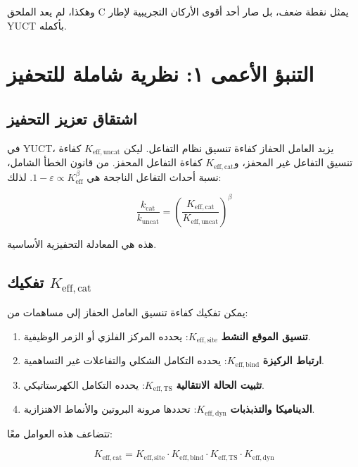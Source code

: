\documentclass[12pt,a4paper]{article}
\theoremstyle{remark}
\newcommand{\Keff}{K_{\mathrm{eff}}}
\newcommand{\eps}{\varepsilon}
\begin{document}
	وهكذا، لم يعد الملحق C يمثل نقطة ضعف، بل صار أحد أقوى الأركان التجريبية لإطار YUCT بأكمله.
	
	\section{التنبؤ الأعمى ١: نظرية شاملة للتحفيز}
	\label{sec:catalysis}
	
	\subsection{اشتقاق تعزيز التحفيز}
	
	في YUCT، يزيد العامل الحفاز كفاءة تنسيق نظام التفاعل. ليكن $K_{\mathrm{eff},\text{uncat}}$ كفاءة تنسيق التفاعل غير المحفز، و$K_{\mathrm{eff},\text{cat}}$ كفاءة التفاعل المحفز. من قانون الخطأ الشامل، نسبة أحداث التفاعل الناجحة هي $1 - \eps \propto \Keff^{\beta}$. لذلك:
	
	\begin{equation}
		\frac{k_{\text{cat}}}{k_{\text{uncat}}} = \left(\frac{K_{\mathrm{eff},\text{cat}}}{K_{\mathrm{eff},\text{uncat}}}\right)^{\beta}
		\label{eq:cat-enhancement}
	\end{equation}
	
	هذه هي المعادلة التحفيزية الأساسية.
	
	\subsection{تفكيك $K_{\mathrm{eff},\text{cat}}$}
	
	يمكن تفكيك كفاءة تنسيق العامل الحفاز إلى مساهمات من:
	\begin{enumerate}
		\item \textbf{تنسيق الموقع النشط} $K_{\mathrm{eff},\text{site}}$: يحدده المركز الفلزي أو الزمر الوظيفية.
		\item \textbf{ارتباط الركيزة} $K_{\mathrm{eff},\text{bind}}$: يحدده التكامل الشكلي والتفاعلات غير التساهمية.
		\item \textbf{تثبيت الحالة الانتقالية} $K_{\mathrm{eff},\text{TS}}$: يحدده التكامل الكهرستاتيكي.
		\item \textbf{الديناميكا والتذبذبات} $K_{\mathrm{eff},\text{dyn}}$: تحددها مرونة البروتين والأنماط الاهتزازية.
	\end{enumerate}
	
	تتضاعف هذه العوامل معًا:
	
	\begin{equation}
		K_{\mathrm{eff},\text{cat}} = K_{\mathrm{eff},\text{site}} \cdot K_{\mathrm{eff},\text{bind}} \cdot K_{\mathrm{eff},\text{TS}} \cdot K_{\mathrm{eff},\text{dyn}}
		\label{eq:keff-cat}
	\end{equation}
	
\end{document}
